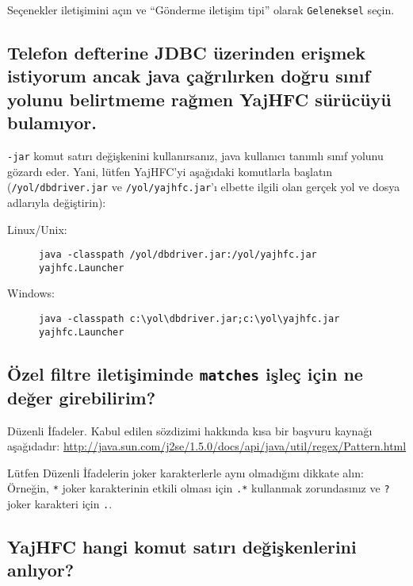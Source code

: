 \documentclass[a4paper,10pt]{scrartcl}
\begin{document}
Seçenekler iletişimini açın ve ``Gönderme iletişim tipi'' olarak \texttt{Geleneksel} seçin.

\subsection{Telefon defterine JDBC üzerinden erişmek istiyorum ancak java çağrılırken doğru sınıf yolunu belirtmeme rağmen YajHFC sürücüyü bulamıyor.}

\texttt{-jar} komut satırı değişkenini kullanırsanız, java kullanıcı tanımlı sınıf yolunu gözardı eder.
Yani, lütfen YajHFC'yi aşağıdaki komutlarla başlatın (\texttt{/yol/dbdriver.jar} ve \texttt{/yol/yajhfc.jar}'ı elbette ilgili olan gerçek yol ve dosya adlarıyla değiştirin):

\begin{description}
\item [Linux/Unix:] \verb#java -classpath /yol/dbdriver.jar:/yol/yajhfc.jar yajhfc.Launcher#
\item [Windows:] \verb#java -classpath c:\yol\dbdriver.jar;c:\yol\yajhfc.jar yajhfc.Launcher#
\end{description}

\subsection{Özel filtre iletişiminde \texttt{matches} işleç için ne değer girebilirim?}

Düzenli İfadeler. Kabul edilen sözdizimi hakkında kısa bir başvuru kaynağı aşağıdadır:
\url{http://java.sun.com/j2se/1.5.0/docs/api/java/util/regex/Pattern.html}

Lütfen Düzenli İfadelerin joker karakterlerle aynı olmadığını dikkate alın:
Örneğin, \verb.*. joker karakterinin etkili olması için \verb#.*# kullanmak zorundasınız 
ve \verb#?# joker karakteri için \verb#.#.

\subsection{YajHFC hangi komut satırı değişkenlerini anlıyor?}
\end{document}
